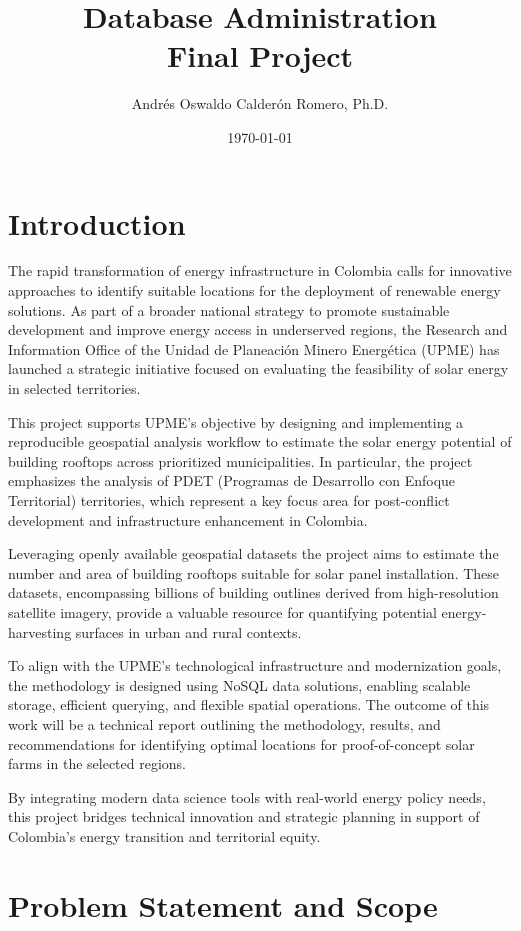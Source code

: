 \documentclass[12pt]{article}
\title{Database Administration \\ Final Project}
\author{Andrés Oswaldo Calderón Romero, Ph.D.}
\date{\today}
\begin{document}
\maketitle

\section{Introduction}

The rapid transformation of energy infrastructure in Colombia calls for innovative approaches to identify suitable locations for the deployment of renewable energy solutions. As part of a broader national strategy to promote sustainable development and improve energy access in underserved regions, the Research and Information Office of the Unidad de Planeación Minero Energética (UPME) has launched a strategic initiative focused on evaluating the feasibility of solar energy in selected territories.

This project supports UPME’s objective by designing and implementing a reproducible geospatial analysis workflow to estimate the solar energy potential of building rooftops across prioritized municipalities. In particular, the project emphasizes the analysis of PDET (Programas de Desarrollo con Enfoque Territorial) territories, which represent a key focus area for post-conflict development and infrastructure enhancement in Colombia.

Leveraging openly available geospatial datasets the project aims to estimate the number and area of building rooftops suitable for solar panel installation. These datasets, encompassing billions of building outlines derived from high-resolution satellite imagery, provide a valuable resource for quantifying potential energy-harvesting surfaces in urban and rural contexts.

To align with the UPME’s technological infrastructure and modernization goals, the methodology is designed using NoSQL data solutions, enabling scalable storage, efficient querying, and flexible spatial operations. The outcome of this work will be a technical report outlining the methodology, results, and recommendations for identifying optimal locations for proof-of-concept solar farms in the selected regions.

By integrating modern data science tools with real-world energy policy needs, this project bridges technical innovation and strategic planning in support of Colombia’s energy transition and territorial equity.

\section{Problem Statement and Scope}
\end{document}
